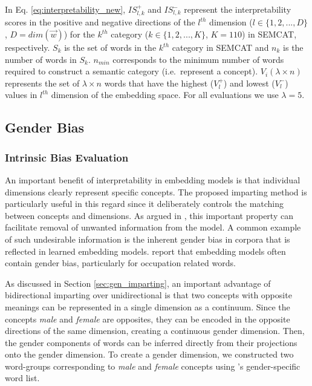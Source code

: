 \documentclass[11pt,a4paper]{article}
\begin{document}
In Eq. \ref{eq:interpretability_new}, $IS^+_{l,k}$ and $IS^-_{l,k}$ represent the interpretability scores in the positive and negative directions of the $l^{th}$ dimension ($l \in \{1,2,...,D\}$, $D=dim(\vec{w})$) for the $k^{th}$ category ($k \in \{1,2,...,K\}$, $K=110$) in SEMCAT, respectively. $S_k$ is the set of words in the $k^{th}$ category in SEMCAT and $n_k$ is the number of words in $S_k$. $n_{min}$ corresponds to the minimum number of words required to construct a semantic category (i.e.\ represent a concept). $V_i(\lambda \times n)$ represents the set of $\lambda \times n$ words that have the highest ($V_l^+$) and lowest ($V_l^-$) values in $l^{th}$ dimension of the embedding space. For all evaluations we use $\lambda=5$.


\subsection{Gender Bias} \label{sec:gender_bias}
 
\subsubsection{Intrinsic Bias Evaluation}
 
An important benefit of interpretability in embedding models is that individual dimensions clearly represent specific concepts. The proposed imparting method is particularly useful in this regard since it deliberately controls the matching between concepts and dimensions. As argued in \citep{dufter19ultraDense}, this important property can facilitate removal of unwanted information from the model. A common example of such undesirable information is the inherent gender bias in corpora that is reflected in learned embedding models. \citet{bolukbasi16debiasing} report that embedding models often contain gender bias,  particularly  for occupation related words. 

As discussed in Section \ref{sec:gen_imparting}, an
important advantage of bidirectional imparting over
unidirectional is that two concepts with opposite meanings
can be represented in a single dimension as a
continuum. Since the concepts \textit{male} and
\textit{female} are opposites, they can be encoded in the
opposite directions of the same dimension, creating a
continuous gender dimension. Then, the gender components of
words can be inferred directly from their projections onto
the gender dimension. To create a gender dimension,
we constructed two word-groups corresponding to
\textit{male} and \textit{female} concepts using
\citep{bolukbasi16debiasing}'s gender-specific word list. 
\end{document}
